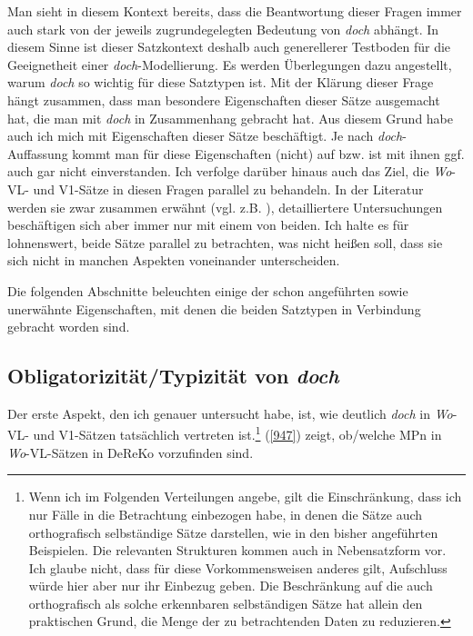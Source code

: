 {Man sieht in diesem Kontext bereits, dass die Beantwortung dieser Fragen immer auch stark von der jeweils zugrundegelegten Bedeutung von \textit{doch} abhängt. In diesem Sinne ist dieser Satzkontext deshalb auch generellerer Testboden für die Geeignetheit einer \textit{doch}-Modellierung. Es werden Überlegungen dazu angestellt, warum \textit{doch} so wichtig für diese Satztypen ist. Mit der Klärung dieser Frage hängt zusammen, dass man besondere Eigenschaften dieser Sätze ausgemacht hat, die man mit \textit{doch} in Zusammenhang gebracht hat. Aus diesem Grund habe auch ich mich mit Eigenschaften dieser Sätze beschäftigt. Je nach \textit{doch}-Auffassung kommt man für diese Eigenschaften (nicht) auf bzw. ist mit ihnen ggf. auch gar nicht einverstanden. Ich verfolge darüber hinaus auch das Ziel, die \textit{Wo}-VL- und V1-Sätze in diesen Fragen parallel zu behandeln. In der Literatur werden sie zwar zusammen erwähnt (vgl. z.B. \citealt[161]{Oennerfors1997}), detaillier\-tere Untersuchungen beschäftigen sich aber immer nur mit einem von beiden. Ich halte es für lohnenswert, beide Sätze parallel zu betrachten, was nicht heißen soll, dass sie sich nicht in manchen Aspekten voneinander unterscheiden.

Die folgenden Abschnitte beleuchten einige der schon angeführten sowie unerwähnte Eigenschaften, mit denen die beiden Satztypen in Verbindung gebracht worden sind.
	
\subsection{Obligatorizität/Typizität von \textit{doch}}
\label{sec:korp}
Der erste Aspekt, den ich genauer untersucht habe, ist, wie deutlich \textit{doch} in \textit{Wo}-VL- und V1-Sätzen tatsächlich vertreten ist.\footnote{Wenn ich im Folgenden Verteilungen angebe, gilt die Einschränkung, dass ich nur Fälle in die Betrachtung einbezogen habe, in denen die Sätze auch orthografisch selbständige Sätze darstellen, wie in den bisher angeführten Beispielen. Die relevanten Strukturen kommen auch in Nebensatzform vor. Ich glaube nicht, dass für diese Vorkommensweisen anderes gilt, Aufschluss würde hier aber nur ihr Einbezug geben. Die Beschränkung auf die auch orthografisch als solche erkennbaren selbständigen Sätze hat allein den praktischen Grund, die Menge der zu betrachtenden Daten zu reduzieren.} (\ref{947}) zeigt, ob/welche MPn in \textit{Wo}-VL-Sätzen in DeReKo vorzufinden sind.

}
